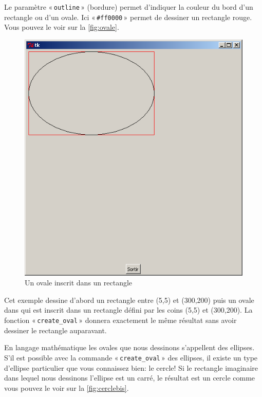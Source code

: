 Le paramètre « \texttt{outline} » (bordure) permet d'indiquer la couleur du bord d'un rectangle ou d'un ovale.
Ici « \texttt{\#ff0000} » permet de dessiner un rectangle rouge. Vous pouvez le voir sur la \autoref{fig:ovale}.

\begin{figure}[h!]
\centering
\includegraphics[scale=0.4]{images/ovale}
\caption{Un ovale inscrit dans un rectangle}\label{fig:ovale}
\end{figure}

Cet exemple dessine d'abord un rectangle entre (5,5) et (300,200) puis un ovale dans qui est inscrit dans un rectangle défini par les coins (5,5) et (300,200). La fonction « \texttt{create\_oval} » donnera exactement le même résultat sans avoir dessiner le rectangle auparavant.

En langage mathématique les ovales que nous dessinons s'appellent des ellipses.
S'il est possible avec la commande « \texttt{create\_oval} »  des ellipses, il existe un type d'ellipse particulier que vous connaissez bien: le cercle!  Si le rectangle imaginaire dans lequel nous dessinons l'ellipse est un carré, le résultat est un cercle comme vous pouvez le voir sur la \autoref{fig:cerclebis}.

